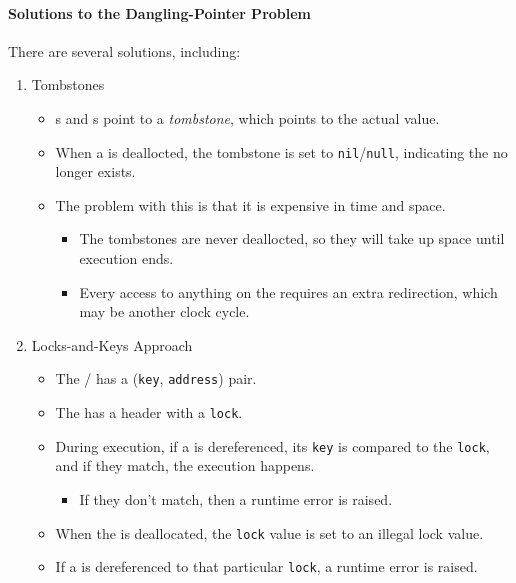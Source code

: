 \paragraph{Solutions to the Dangling-Pointer Problem}\label{par:Pointer-Dangling_Pointer_Solution}
There are several solutions, including:
\begin{enumerate}[noitemsep]
\item Tombstones
  \begin{itemize}[noitemsep]
  \item {}s and s point to a \emph{tombstone}, which points to the actual value.
  \item When a  is deallocted, the tombstone is set to \texttt{nil}/\texttt{null}, indicating the  no longer exists.
  \item The problem with this is that it is expensive in time and space.
    \begin{itemize}[noitemsep]
    \item The tombstones are never deallocted, so they will take up space until execution ends.
    \item Every access to anything on the  requires an extra redirection, which may be another clock cycle.
    \end{itemize}
  \end{itemize}
\item Locks-and-Keys Approach
  \begin{itemize}[noitemsep]
  \item The / has a (\texttt{key}, \texttt{address}) pair.
  \item The  has a header with a \texttt{lock}.
  \item During execution, if a  is dereferenced, its \texttt{key} is compared to the \texttt{lock}, and if they match, the execution happens.
    \begin{itemize}[noitemsep]
    \item If they don't match, then a runtime error is raised.
    \end{itemize}
  \item When the  is deallocated, the \texttt{lock} value is set to an illegal lock value.
  \item If a  is dereferenced to that particular \texttt{lock}, a runtime error is raised.
  \end{itemize}
\end{enumerate}

